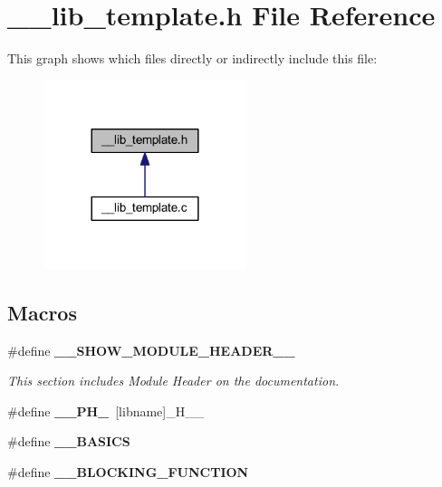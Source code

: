 \section{\-\_\-\-\_\-lib\-\_\-template.\-h File Reference}
\label{____lib__template_8h}
This graph shows which files directly or indirectly include this file\-:\nopagebreak
\begin{figure}[H]
\begin{center}
\leavevmode
\includegraphics[width=168pt]{____lib__template_8h__dep__incl}
\end{center}
\end{figure}
\subsection*{Macros}
\begin{DoxyCompactItemize}
\item 
\#define {\bf \-\_\-\-\_\-\-S\-H\-O\-W\-\_\-\-M\-O\-D\-U\-L\-E\-\_\-\-H\-E\-A\-D\-E\-R\-\_\-\-\_\-}
\begin{DoxyCompactList}\small\item\em This section includes Module Header on the documentation. \end{DoxyCompactList}\item 
\#define {\bf \-\_\-\-\_\-\-P\-H\-\_\-}~[libname]\-\_\-\-H\-\_\-\-\_\-
\item 
\#define {\bf \-\_\-\-\_\-\-B\-A\-S\-I\-C\-S}
\item 
\#define {\bf \-\_\-\-\_\-\-B\-L\-O\-C\-K\-I\-N\-G\-\_\-\-F\-U\-N\-C\-T\-I\-O\-N}
\end{DoxyCompactItemize}
